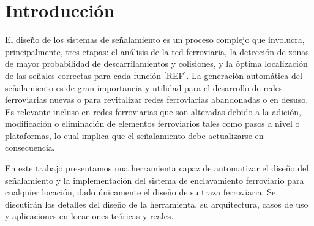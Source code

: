 \chapter{Introducción}

    El diseño de los sistemas de señalamiento es un proceso complejo que involucra, principalmente, tres etapas: el análisis de la red ferroviaria, la detección de zonas de mayor probabilidad de descarrilamientos y colisiones, y la óptima localización de las señales correctas para cada función [REF]. La generación automática del señalamiento es de gran importancia y utilidad para el desarrollo de redes ferroviarias nuevas o para revitalizar redes ferroviarias abandonadas o en desuso. Es relevante incluso en redes ferroviarias que son alteradas debido a la adición, modificación o eliminación de elementos ferroviarios tales como pasos a nivel o plataformas, lo cual implica que el señalamiento debe actualizarse en consecuencia.
    
    En este trabajo presentamos una herramienta capaz de automatizar el diseño del señalamiento y la implementación del sistema de enclavamiento ferroviario para cualquier locación, dado únicamente el diseño de su traza ferroviaria. Se discutirán los detalles del diseño de la herramienta, su arquitectura, casos de uso y aplicaciones en locaciones teóricas y reales.




